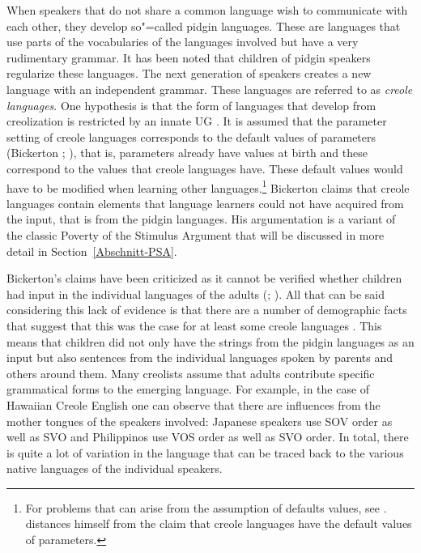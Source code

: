 When speakers that do not share a common language wish to communicate with each other, they develop so"=called
pidgin languages. These are languages that use parts of the vocabularies of the languages involved but have a very rudimentary
grammar. It has been noted that children of pidgin speakers regularize these languages. The next generation of speakers creates a new language with an independent
grammar. These languages are referred to as \emph{creole languages}.
One hypothesis is that the form of languages that develop from creolization is restricted by an innate UG \citep{Bickerton84a}. It is assumed that
the parameter setting of creole languages corresponds to the default values of parameters (Bickerton \citeyear[]{Bickerton84b};
\citeyear[]{Bickerton84a}), that is, parameters already have values at birth and these
correspond to the values that creole languages have. These default values would have to be modified when learning other languages.\footnote{%
	For problems that can arise from the assumption of defaults values, see  . \citet[, fn.\,13]{Bickerton97a} distances himself from the claim that creole languages have
  the default values of parameters.
} 
Bickerton claims that creole languages contain elements that language learners could not have
acquired from the input, that is from the pidgin languages. His argumentation is a variant of the classic Poverty of the Stimulus Argument that will be discussed in more detail in Section~\ref{Abschnitt-PSA}.

\addlines
Bickerton's claims have been criticized as it cannot be verified whether children had input in the individual languages
of the adults (\citealp[]{Samarin84a}; \citealp[]{Seuren84a}). All that can be said considering this lack of evidence is that there are a number
of demographic facts that suggest that this was the case for at least some creole languages
\citep{Arends2008a}.
This means that children did not only have the strings from the pidgin languages as an input but
also sentences from the individual languages spoken by parents and others around them. Many creolists assume that adults contribute specific grammatical forms to the emerging language. For example, in the case of Hawaiian Creole English
one can observe that there are influences from the mother tongues of the speakers involved: Japanese speakers use SOV order as well as SVO and Philippinos use VOS order as well
as SVO order. In total, there is quite a lot of variation in the language that can be traced back to the various native languages of the individual speakers.

